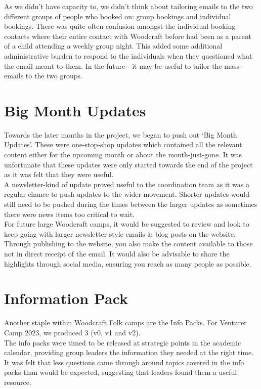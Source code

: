 As we didn't have capacity to, we didn't think about tailoring emails to the two different groups of people who booked on: group bookings and individual bookings. There was quite often confusion amongst the individual booking contacts where their entire contact with Woodcraft before had been as a parent of a child attending a weekly group night. This added some additional administrative burden to respond to the individuals when they questioned what the email meant to them. In the future - it may be useful to tailor the mass-emails to the two groups.

\section{Big Month Updates}
Towards the later months in the project, we began to push out `Big Month Updates'. These were one-stop-shop updates which contained all the relevant content either for the upcoming month or about the month-just-gone. It was unfortunate that these updates were only started towards the end of the project as it was felt that they were useful.\\

A newsletter-kind of update proved useful to the coordination team as it was a regular chance to push updates to the wider movement. Shorter updates would still need to be pushed during the times between the larger updates as sometimes there were news items too critical to wait. \\

For future large Woodcraft camps, it would be suggested to review and look to keep going with larger newsletter style emails \& blog posts on the website. Through publishing to the website, you also make the content available to those not in direct receipt of the email. It would also be advisable to share the highlights through social media, ensuring you reach as many people as possible.

\section{Information Pack}
Another staple within Woodcraft Folk camps are the Info Packs. For Venturer Camp 2023, we produced 3 (v0, v1 and v2). \\

The info packs were timed to be released at strategic points in the academic calendar, providing group leaders the information they needed at the right time. It was felt that less questions came through around topics covered in the info packs than would be expected, suggesting that leaders found them a useful resource.\\

